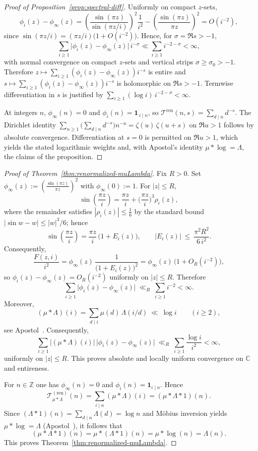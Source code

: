 \documentclass[11pt,a4paper]{amsart}
\newcommand{\C}{\mathbb{C}}
\theoremstyle{plain}
\theoremstyle{definition}
\theoremstyle{remark}
\begin{document}
\begin{proof}[Proof of Proposition~\ref{prop:spectral-diff}]
Uniformly on compact $z$-sets,
\[
\phi_i(z)-\phi_\infty(z)
=\left(\frac{\sin(\pi z)}{\sin(\pi z/i)}\right)^{\!2}\frac{1}{i^2}
-\left(\frac{\sin(\pi z)}{\pi z}\right)^{\!2}
=O(i^{-2}),
\]
since $\sin(\pi z/i)=(\pi z/i)\bigl(1+O(i^{-2})\bigr)$. Hence, for $\sigma=\Re s>-1$,
\[
\sum_{i\ge1}\bigl|\phi_i(z)-\phi_\infty(z)\bigr|\,i^{-\sigma}
\ll \sum_{i\ge1} i^{-2-\sigma}<\infty,
\]
with normal convergence on compact $z$-sets and vertical strips $\sigma\ge\sigma_0>-1$. Therefore $z\mapsto \sum_{i\ge1}(\phi_i(z)-\phi_\infty(z))i^{-s}$ is entire and $s\mapsto \sum_{i\ge1}(\phi_i(z)-\phi_\infty(z))i^{-s}$ is holomorphic on $\Re s>-1$. Termwise differentiation in $s$ is justified by $\sum_{i\ge1}(\log i)\,i^{-2-\sigma}<\infty$.

At integers $n$, $\phi_\infty(n)=0$ and $\phi_i(n)=\mathbf 1_{\,i\mid n}$, so $\mathcal T^{\mathrm{ren}}(n,s)=\sum_{d\mid n} d^{-s}$. The Dirichlet identity $\sum_{n\ge1}\big(\sum_{d\mid n}d^{-s}\big)n^{-u}=\zeta(u)\,\zeta(u+s)$ on $\Re u>1$ follows by absolute convergence. Differentiation at $s=0$ is permitted on $\Re u>1$, which yields the stated logarithmic weights and, with Apostol’s identity $\mu*\log=\Lambda$, the claims of the proposition.
\end{proof}


\begin{proof}[Proof of Theorem~\ref{thm:renormalized-muLambda}]
Fix $R>0$. Set $\phi_\infty(z):=\left(\frac{\sin(\pi z)}{\pi z}\right)^{2}$ with $\phi_\infty(0):=1$. For $|z|\le R$,
\[
\sin\!\left(\frac{\pi z}{i}\right)=\frac{\pi z}{i}+\Big(\frac{\pi z}{i}\Big)^3 \rho_i(z),
\]
where the remainder satisfies $|\rho_i(z)|\le \tfrac{1}{6}$ by the standard bound $|\sin w - w|\le |w|^3/6$; hence
\[
\sin\!\left(\frac{\pi z}{i}\right)=\frac{\pi z}{i}\,\bigl(1+E_i(z)\bigr),\qquad |E_i(z)|\ \le\ \frac{\pi^2 R^2}{6\,i^{2}}.
\]
Consequently,
\[
\frac{F(z,i)}{i^2}
=\phi_\infty(z)\,\frac{1}{\bigl(1+E_i(z)\bigr)^2}
=\phi_\infty(z)\,\bigl(1+O_R(i^{-2})\bigr),
\]
so $\phi_i(z)-\phi_\infty(z)=O_R(i^{-2})$ uniformly on $|z|\le R$. Therefore
\[
\sum_{i\ge1}\bigl|\phi_i(z)-\phi_\infty(z)\bigr|\ \ll_R\ \sum_{i\ge1} i^{-2}<\infty.
\]
Moreover,
\[
(\mu*\Lambda)(i)=\sum_{d\mid i}\mu(d)\,\Lambda(i/d)\ \ll\ \log i\qquad(i\ge2),
\]
see Apostol~\cite[Ch.~2]{apostol1976}. Consequently,
\[
\sum_{i\ge1}\bigl|(\mu*\Lambda)(i)\bigr|\,\bigl|\phi_i(z)-\phi_\infty(z)\bigr|
\ \ll_R\ \sum_{i\ge1}\frac{\log i}{i^{2}}<\infty,
\]
uniformly on $|z|\le R$. This proves absolute and locally uniform convergence on $\C$ and entireness.

For $n\in\mathbb{Z}$ one has $\phi_\infty(n)=0$ and $\phi_i(n)=\mathbf{1}_{i\mid n}$. Hence
\[
\mathcal{T}^{(\mathrm{ren})}_{\mu*\Lambda}(n)=\sum_{i\mid n}(\mu*\Lambda)(i)=(\mu*\Lambda*1)(n).
\]
Since $(\Lambda*1)(n)=\sum_{d\mid n}\Lambda(d)=\log n$ and Möbius inversion yields $\mu*\log=\Lambda$ (Apostol~\cite[Ch.~2]{apostol1976}), it follows that
\[
(\mu*\Lambda*1)(n)=\mu*(\Lambda*1)(n)=\mu*\log(n)=\Lambda(n).
\]
This proves Theorem~\ref{thm:renormalized-muLambda}.
\end{proof}
\end{document}
